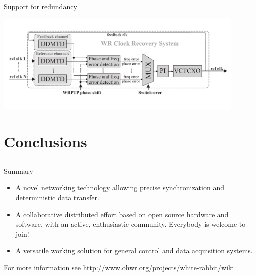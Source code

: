 \documentclass[compress, red]{beamer}
\begin{document}
\begin{frame}{Support for redundancy}
 \begin{center}
   \includegraphics[width=0.9\textwidth]{../../figures/robustness/wrCRS.pdf}
   \end{center}
\end{frame}


\section{Conclusions}
\subsection{}

\begin{frame}{Summary}
 \begin{itemize}
  \pause  
  \item A novel networking technology allowing precise synchronization
    and deterministic data transfer.
  \pause
\item A collaborative distributed effort based on open source hardware
  and software, with an active, enthusiastic community. Everybody is
  welcome to join!  \pause
   \item A versatile working solution for general control and data
    acquisition systems.
 \end{itemize}
 \pause
For more information see http://www.ohwr.org/projects/white-rabbit/wiki
\end{frame}
\end{document}
